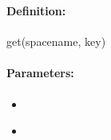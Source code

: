 %
%
%


\pagebreak
\subsubsection{}
\label{api:ruby:get}


\paragraph{Definition:}
\begin{rubycode}
get(spacename, key)
\end{rubycode}

\paragraph{Parameters:}
\begin{itemize}[noitemsep]
\item {}\\

\item {}\\

\end{itemize}

